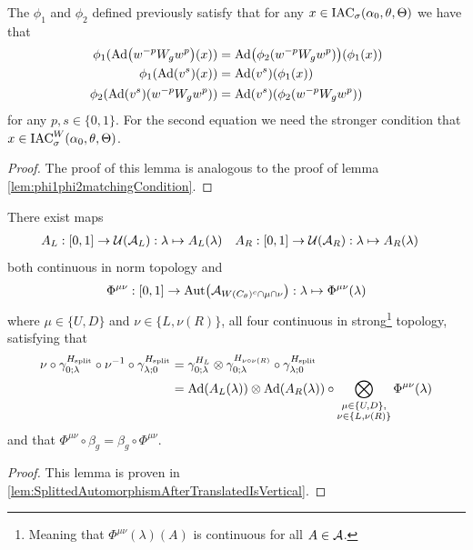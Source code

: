 \documentclass[12pt,a4paper,twoside]{article}
\numberwithin{equation}{section}
\begin{document}
\begin{lemma}\label{lem:phi1phi2matchingConditionH1ValuedIndex}
The $\phi_1$ and $\phi_2$ defined previously satisfy that for any $x\in\IAC_{\sigma}(\alpha_0,\theta,\Theta)$ we have that
	\begin{align}
		\phi_1(\Ad{w^{-p} W_g w^{p}}(x))&=\Ad{\phi_2(w^{-p} W_g w^{p})}(\phi_1(x))\\
		\phi_1(\Ad{v^{s}}(x))&=\Ad{v^{s}}(\phi_1(x))\\
		\phi_2(\Ad{v^s}(w^{-p} W_gw^{p}))&=\Ad{v^s}(\phi_2(w^{-p} W_g w^{p}))
	\end{align}
	for any $p,s\in\{0,1\}$. For the second equation we need the stronger condition that $x\in\IAC_{\sigma}^W(\alpha_0,\theta,\Theta)$.
\end{lemma}
\begin{proof}
	The proof of this lemma is analogous to the proof of lemma \ref{lem:phi1phi2matchingCondition}.
\end{proof}
\begin{lemma}\label{lem:TranslatingSplittedTimeEvolution}
	There exist maps
	\begin{align}
		A_L&:[0,1]\rightarrow \UU(\AA_L):\lambda\mapsto A_{L}(\lambda)&A_R&:[0,1]\rightarrow \UU(\AA_R):\lambda\mapsto A_{R}(\lambda)
	\end{align}
	both continuous in norm topology and
	\begin{align}
		\Phi^{\mu\nu}:[0,1]\rightarrow\Aut{\AA_{W(C_\theta)^c\cap\mu\cap\nu}}:\lambda\mapsto \Phi^{\mu\nu}(\lambda)
	\end{align}
	where $\mu\in\{U,D\}$ and $\nu\in\{L,\nu(R)\}$, all four continuous in strong\footnote{Meaning that $\Phi^{\mu\nu}(\lambda)(A)$ is continuous for all $A\in\AA$.} topology, satisfying that
	\begin{align}
		\nu\circ\gamma^{H_{\text{split}}}_{0;\lambda}\circ\nu^{-1}\circ\gamma^{H_{\text{split}}}_{\lambda;0}&=\gamma^{H_L}_{0;\lambda}\otimes\gamma^{H_{\nu\circ\nu(R)}}_{0;\lambda}\circ\gamma^{H_{\text{split}}}_{\lambda;0}\\
		\label{eq:TranslatingSplittedTimeEvolution}
		&=\Ad{A_L(\lambda)}\otimes\Ad{A_R(\lambda)}\circ\bigotimes_{\substack{\mu\in\{U,D\},\\\nu\in\{L,\nu(R)\}}}\Phi^{\mu\nu}(\lambda)
	\end{align}
	and that $\Phi^{\mu\nu}\circ\beta_g=\beta_g\circ\Phi^{\mu\nu}$.
\end{lemma}
\begin{proof}
	This lemma is proven in \ref{lem:SplittedAutomorphismAfterTranslatedIsVertical}.
\end{proof}
\end{document}
